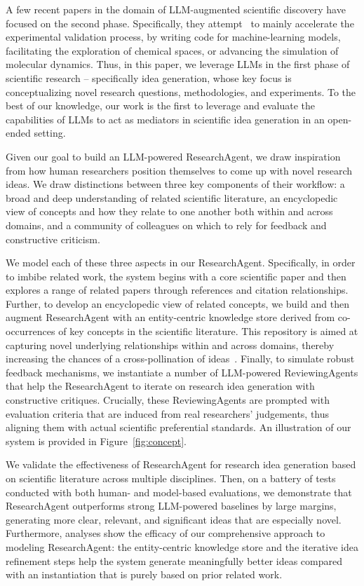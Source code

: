 \documentclass[11pt]{article}
\begin{document}
A few recent papers in the domain of LLM-augmented scientific discovery have focused on the second phase. Specifically, they attempt~\cite{Airesearchagent, LLM/discovery/1, LLM/discovery/2} to mainly accelerate the experimental validation process, by writing code for machine-learning models, facilitating the exploration of chemical spaces, or advancing the simulation of molecular dynamics.
Thus, in this paper, we leverage LLMs in the first phase of scientific research -- specifically idea generation, whose key focus is conceptualizing novel research questions, methodologies, and experiments. To the best of our knowledge, our work is the first to leverage and evaluate the capabilities of LLMs to act as mediators in scientific idea generation in an open-ended setting.

Given our goal to build an LLM-powered ResearchAgent, we draw inspiration from how human researchers position themselves to come up with novel research ideas. We draw distinctions between three key components of their workflow: a broad and deep understanding of related scientific literature, an encyclopedic view of concepts and how they relate to one another both within and across domains, and a community of colleagues on which to rely for feedback and constructive criticism.

We model each of these three aspects in our ResearchAgent. Specifically, in order to imbibe related work, the system begins with a core scientific paper and then explores a range of related papers through references and citation relationships. Further, to develop an encyclopedic view of related concepts, we build and then augment ResearchAgent with an entity-centric knowledge store derived from co-occurrences of key concepts in the scientific literature. This repository is aimed at capturing novel underlying relationships within and across domains, thereby increasing the chances of a cross-pollination of ideas~\cite{cross-pollination}. Finally, to simulate robust feedback mechanisms, we instantiate a number of LLM-powered ReviewingAgents that help the ResearchAgent to iterate on research idea generation with constructive critiques. Crucially, these ReviewingAgents are prompted with evaluation criteria that are induced from real researchers' judgements, thus aligning them with actual scientific preferential standards. An illustration of our system is provided in Figure~\ref{fig:concept}.

We validate the effectiveness of ResearchAgent for research idea generation based on scientific literature across multiple disciplines. Then, on a battery of tests conducted with both human- and model-based evaluations, we demonstrate that ResearchAgent outperforms strong LLM-powered baselines by large margins, generating more clear, relevant, and significant ideas that are especially novel. Furthermore, analyses show the efficacy of our comprehensive approach to modeling ResearchAgent: the entity-centric knowledge store and the iterative idea refinement steps help the system generate meaningfully better ideas compared with an instantiation that is purely based on prior related work.
\end{document}
